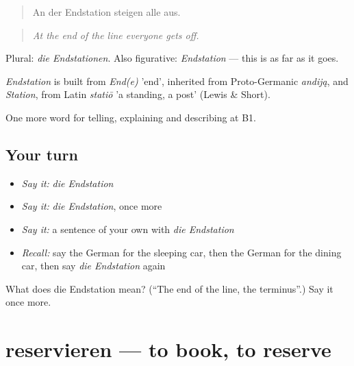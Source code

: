 \begin{quote}
An der Endstation steigen alle aus.
\end{quote}

\begin{quote}
\emph{At the end of the line everyone gets off.}
\end{quote}

Plural: \emph{die Endstationen}. Also figurative: \emph{Endstation} — this is as far as it goes.

\begin{cousinweb}
\emph{Endstation} is built from \emph{End(e)} 'end', inherited from Proto-Germanic \emph{andiją}, and \emph{Station}, from Latin \emph{statiō} 'a standing, a post' (Lewis \& Short).
\end{cousinweb}

\begin{grammarlens}[title={What you've built}]
One more word for telling, explaining and describing at B1.
\end{grammarlens}

\subsection*{Your turn}
\begin{itemize}
\raggedright
  \item \emph{Say it:} \emph{die Endstation}
  \item \emph{Say it:} \emph{die Endstation}, once more
  \item \emph{Say it:} a sentence of your own with \emph{die Endstation}
  \item \emph{Recall:} say the German for the sleeping car, then the German for the dining car, then say \emph{die Endstation} again
\end{itemize}

\begin{tcolorbox}[breakable,colback=teal!4,colframe=teal!35!black,title={Before you move on}]
What does die Endstation mean? (\textquotedblleft{}The end of the line, the terminus\textquotedblright{}.) Say it once more.
\end{tcolorbox}
\section[reservieren]{reservieren — to book, to reserve}

\label{lesson:GE-C413-reservieren}



